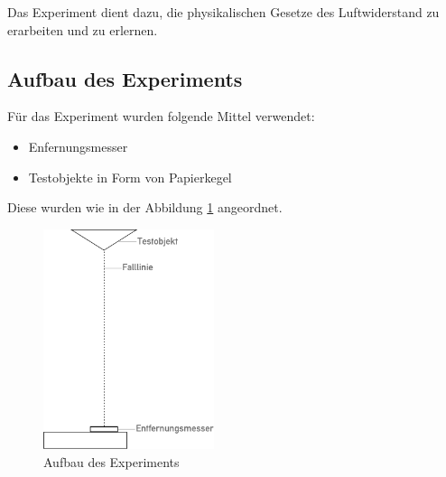 Das Experiment dient dazu, die physikalischen Gesetze des Luftwiderstand zu erarbeiten und zu erlernen. 

\subsection{Aufbau des Experiments}

Für das Experiment wurden folgende Mittel verwendet:

\begin{itemize}
	\item Enfernungsmesser
	\item Testobjekte in Form von Papierkegel
\end{itemize}

Diese wurden wie in der Abbildung \ref{fig:expsetup} angeordnet.

\begin{figure}
	\center
	\includegraphics[width=5cm]{diagrams/experiment_aufbau}\caption{\label{fig:expsetup} Aufbau des Experiments}	
\end{figure}
